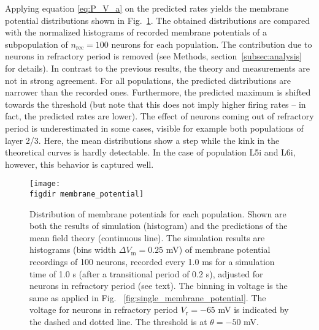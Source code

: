 Applying equation \eqref{eq:P_V_a} on the predicted rates yields the 
membrane potential distributions shown in 
Fig.~\ref{fig:membrane_potential}. 
The obtained distributions are compared with the normalized histograms of recorded 
membrane potentials of a subpopulation of $n_\text{rec} = 100$ neurons for 
each population. The contribution due to neurons in refractory period is removed
(see Methods, section~\ref{subsec:analysis} for details). 
In contrast to the previous results, the theory and measurements are not in strong agreement. 
For all populations, the predicted distributions are narrower than the recorded ones.
Furthermore, the predicted maximum is shifted towards the threshold (but note that
this does not imply higher firing rates -- in fact, the predicted rates are lower). 
The effect
of neurons coming out of refractory period is underestimated in some cases, 
visible for example both populations of layer 2/3. Here, the mean distributions 
show a step while the kink in the theoretical curves is hardly detectable. 
In the case of population L5i and L6i, however, this behavior is captured well. 

\begin{figure}[tb]
    \centering
    \texttt{[image: \\figdir membrane\_potential]}
    \caption[Distribution of membrane potentials]{
        Distribution of membrane potentials for each population. 
        Shown are both the results of simulation (histogram) and 
        the predictions of the mean field theory (continuous line). 
        The simulation results are histograms (bins width $\Delta V_\text{m} = 0.25$ mV) 
        of membrane potential recordings 
        of 100 neurons, recorded every 1.0 ms for a simulation time of 1.0 s 
        (after a transitional period of 0.2 s), 
        adjusted for neurons in refractory period (see text). 
        The binning in voltage is the same as applied in Fig.~%
        \ref{fig:single_membrane_potential}. 
        The voltage for neurons in refractory period $V_\text{r} = -65$ mV 
        is indicated by the dashed and dotted line. The threshold is at 
        $\theta = -50$ mV. 
    }
    \label{fig:membrane_potential}
\end{figure}

